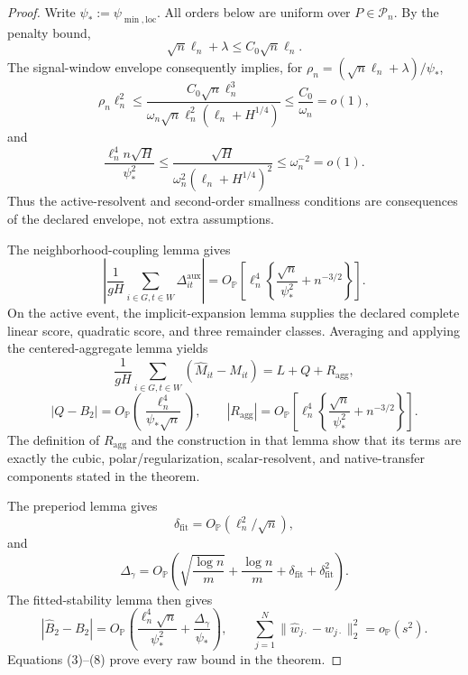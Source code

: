 \documentclass{article}
\begin{document}
\begin{proof}
Write \(\psi_*:=\psi_{\min,\mathrm{loc}}\).  All orders below are uniform over \(P\in\mathcal P_n\).  By the penalty bound,
\[
 \sqrt n\ell_n+\lambda\le C_0\sqrt n\ell_n.
\]
The signal-window envelope consequently implies, for
\(\rho_n=(\sqrt n\ell_n+\lambda)/\psi_*\),
\[
 \rho_n\ell_n^2
 \le\frac{C_0\sqrt n\ell_n^3}
 {\omega_n\sqrt n\ell_n^2(\ell_n+H^{1/4})}
 \le\frac{C_0}{\omega_n}=o(1),
 \tag{1}
\]
and
\[
 \frac{\ell_n^4n\sqrt H}{\psi_*^2}
 \le\frac{\sqrt H}{\omega_n^2(\ell_n+H^{1/4})^2}
 \le\omega_n^{-2}=o(1).
 \tag{2}
\]
Thus the active-resolvent and second-order smallness conditions are consequences of the declared envelope, not extra assumptions.

The neighborhood-coupling lemma gives
\[
 \left|\frac1{gH}\sum_{i\in G,t\in W}\Delta^{\mathrm{aux}}_{it}\right|
 =O_{\mathbb P}\!\left[
 \ell_n^4\left\{\frac{\sqrt n}{\psi_*^2}+n^{-3/2}\right\}\right].
 \tag{3}
\]
On the active event, the implicit-expansion lemma supplies the declared complete linear score, quadratic score, and three remainder classes.  Averaging and applying the centered-aggregate lemma yields
\[
 \frac1{gH}\sum_{i\in G,t\in W}(\widehat M_{it}-M_{it})
 =L+Q+R_{\mathrm{agg}},
 \tag{4}
\]
\[
 |Q-B_2|=O_{\mathbb P}\!\left(\frac{\ell_n^4}{\psi_*\sqrt n}\right),
 \qquad
 |R_{\mathrm{agg}}|=O_{\mathbb P}\!\left[
 \ell_n^4\left\{\frac{\sqrt n}{\psi_*^2}+n^{-3/2}\right\}\right].
 \tag{5}
\]
The definition of \(R_{\mathrm{agg}}\) and the construction in that lemma show that its terms are exactly the cubic, polar/regularization, scalar-resolvent, and native-transfer components stated in the theorem.

The preperiod lemma gives
\[
 \delta_{\mathrm{fit}}=O_{\mathbb P}(\ell_n^2/\sqrt n),
 \tag{6}
\]
and
\[
 \Delta_\gamma=O_{\mathbb P}\!\left(
 \sqrt{\frac{\log n}{m}}+\frac{\log n}{m}
 +\delta_{\mathrm{fit}}+\delta_{\mathrm{fit}}^2\right).
 \tag{7}
\]
The fitted-stability lemma then gives
\[
 |\widehat B_2-B_2|=O_{\mathbb P}\!\left(
 \frac{\ell_n^4\sqrt n}{\psi_*^2}
 +\frac{\Delta_\gamma}{\psi_*}\right),
 \qquad
 \sum_{j=1}^N\|\widehat w_{j\cdot}-w_{j\cdot}\|_2^2=o_{\mathbb P}(s^2).
 \tag{8}
\]
Equations (3)--(8) prove every raw bound in the theorem.


\end{proof}
\end{document}
